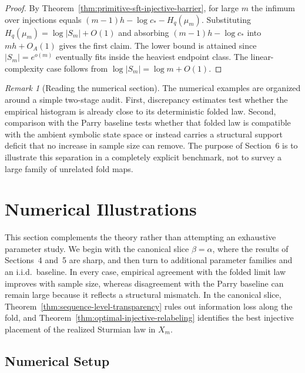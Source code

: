 \documentclass[11pt,letterpaper]{article}
\numberwithin{equation}{section}
\theoremstyle{plain}
\theoremstyle{definition}
\theoremstyle{remark}
\newtheorem{remark}[theorem]{Remark}
\begin{document}
\begin{proof}
By Theorem~\ref{thm:primitive-sft-injective-barrier}, for large \(m\) the
infimum over injections equals
\((m-1)h-\log c_*-H_q(\mu_m)\). Substituting
\(H_q(\mu_m)=\log|S_m|+O(1)\) and absorbing \((m-1)h-\log c_*\) into
\(mh+O_A(1)\) gives the first claim. The lower bound is attained since
\(|S_m|=e^{o(m)}\) eventually fits inside the heaviest endpoint class. The
linear-complexity case follows from \(\log|S_m|=\log m+O(1)\).
\end{proof}

\begin{remark}[Reading the numerical section]
\label{rem:coarse-graining-audit}
The numerical examples are organized around a simple two-stage audit.
First, discrepancy estimates test whether the empirical histogram is already
close to its deterministic folded law. Second, comparison with the Parry
baseline tests whether that folded law is compatible with the ambient symbolic
state space or instead carries a structural support deficit that no increase in
sample size can remove. The purpose of Section~6 is to illustrate this
separation in a completely explicit benchmark, not to survey a large family of
unrelated fold maps.
\end{remark}

\section{Numerical Illustrations}

This section complements the theory rather than attempting an exhaustive
parameter study. We begin with the canonical slice \(\beta=\alpha\), where the
results of Sections~4 and~5 are sharp, and then turn to additional parameter
families and an i.i.d.\ baseline. In every case, empirical
agreement with the folded limit law improves with sample size, whereas
disagreement with the Parry baseline can remain large because it reflects a
structural mismatch. In the canonical slice,
Theorem~\ref{thm:sequence-level-transparency} rules out information loss along
the fold, and Theorem~\ref{thm:optimal-injective-relabeling} identifies the
best injective placement of the realized Sturmian law in \(X_m\).

\subsection{Numerical Setup}
\end{document}
